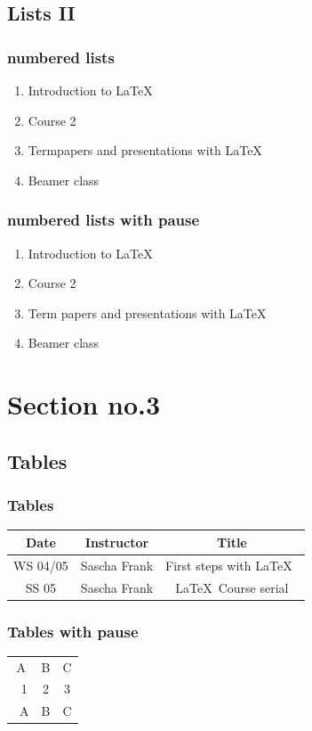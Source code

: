 \documentclass{beamer}
\begin{document}
\subsection{Lists II}
\begin{frame}\frametitle{numbered lists}
\begin{enumerate}
\item Introduction to  \LaTeX\
\item Course 2 
\item Termpapers and presentations with \LaTeX\
\item Beamer class
\end{enumerate}
\end{frame}

\begin{frame}\frametitle{numbered lists with pause}
\begin{enumerate}
\item Introduction to  \LaTeX\ \pause\
\item Course 2 \pause\
\item Term papers and presentations with \LaTeX\ \pause\
\item Beamer class
\end{enumerate}
\end{frame}

\section{Section no.3}
\subsection{Tables}
\begin{frame}\frametitle{Tables}
\begin{tabular}{|c|c|c|}
\hline
\textbf{Date} & \textbf{Instructor} & \textbf{Title} \\
\hline
WS 04/05 & Sascha Frank & First steps with  \LaTeX\  \\
\hline
SS 05 & Sascha Frank & \LaTeX\ Course serial \\
\hline
\end{tabular}
\end{frame}


\begin{frame}\frametitle{Tables with pause}
\begin{tabular}{c c c}
A & B & C \\
\pause\
1 & 2 & 3 \\
\pause\
A & B & C \\
\end{tabular}
\end{frame}
\end{document}
